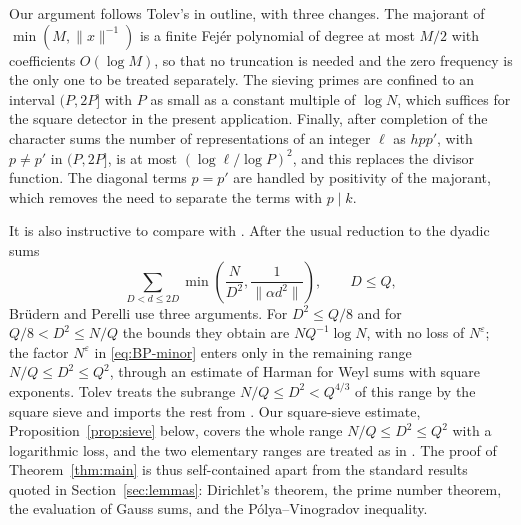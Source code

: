 \documentclass[11pt]{amsart}
\numberwithin{equation}{section}
\numberwithin{figure}{section}
\theoremstyle{definition}
\newcommand{\eps}{\varepsilon}
\begin{document}
Our argument follows Tolev's in outline, with three changes.  The
majorant of $\min(M,\|x\|^{-1})$ is a finite Fej\'er polynomial of degree
at most $M/2$ with coefficients $O(\log M)$, so that no truncation is
needed and the zero frequency is the only one to be treated separately.
The sieving primes are confined to an interval $(P,2P]$ with $P$ as small
as a constant multiple of $\log N$, which suffices for the square detector
in the present application.
Finally, after completion of the character sums the number of
representations of an integer $\ell$ as $hpp'$, with $p\ne p'$ in
$(P,2P]$, is at most $(\log\ell/\log P)^2$, and this replaces the divisor
function.  The diagonal terms $p=p'$ are handled by positivity of the
majorant, which removes the need to separate the terms with $p\mid k$.

It is also instructive to compare with \cite{BP}.  After the usual
reduction to the dyadic sums
\begin{equation}\label{eq:dyadic-intro}
  \sum_{D<d\le2D}\min\left(\frac N{D^2},\frac1{\|\alpha d^2\|}\right),
  \qquad D\le Q,
\end{equation}
Br\"udern and Perelli use three arguments.  For $D^2\le Q/8$ and for
$Q/8<D^2\le N/Q$ the bounds they obtain are $N Q^{-1}\log N$, with no loss of
$N^{\eps}$; the factor $N^{\eps}$ in \eqref{eq:BP-minor} enters only in the
remaining range $N/Q\le D^2\le Q^2$, through an estimate of Harman for
Weyl sums with square exponents.  Tolev treats the subrange
$N/Q\le D^2<Q^{4/3}$ of this range by the square sieve and imports the
rest from \cite{BP}.  Our square-sieve estimate, Proposition~\ref{prop:sieve}
below, covers the whole range $N/Q\le D^2\le Q^2$ with a logarithmic loss,
and the two elementary ranges are treated as in \cite{BP}.  The proof of Theorem~\ref{thm:main} is
thus self-contained apart from the standard results quoted in
Section~\ref{sec:lemmas}: Dirichlet's theorem, the prime number theorem,
the evaluation of Gauss sums, and the P\'olya--Vinogradov inequality.
\end{document}
